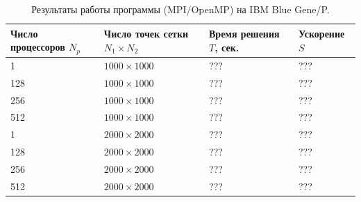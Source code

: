\documentclass[11pt]{article}
\numberwithin{equation}{section}
\theoremstyle{plain}
\theoremstyle{definition}
\begin{document}
\begin{table}[h]
\centering
\begin{tabular}{|l|l|l|l|}\hline
Число процессоров $N_p$ & Число точек сетки $N_1 \times N_2$ & Время решения $T$, сек. & Ускорение $S$ \\ \hline
1                       & $1000 \times 1000$                 & ???                     & ???           \\
128                     & $1000 \times 1000$                 & ???                     & ???           \\
256                     & $1000 \times 1000$                 & ???                     & ???           \\
512                     & $1000 \times 1000$                 & ???                     & ???           \\ \hline
1                       & $2000 \times 2000$                 & ???                     & ???           \\
128                     & $2000 \times 2000$                 & ???                     & ???           \\
256                     & $2000 \times 2000$                 & ???                     & ???           \\
512                     & $2000 \times 2000$                 & ???                     & ???           \\ \hline
\end{tabular}
    \caption{Результаты работы программы (MPI/OpenMP) на IBM Blue Gene/P.}
\label{tab_mpi}
\end{table}
\end{document}
